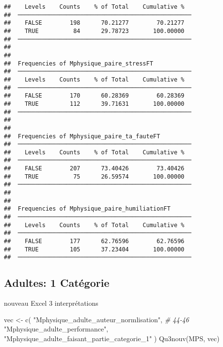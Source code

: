 \documentclass[
]{article}
\newenvironment{Shaded}{\begin{snugshade}}{\end{snugshade}}
\newcommand{\CommentTok}[1]{\textcolor[rgb]{0.56,0.35,0.01}{\textit{#1}}}
\newcommand{\FunctionTok}[1]{\textcolor[rgb]{0.00,0.00,0.00}{#1}}
\newcommand{\NormalTok}[1]{#1}
\newcommand{\OtherTok}[1]{\textcolor[rgb]{0.56,0.35,0.01}{#1}}
\newcommand{\StringTok}[1]{\textcolor[rgb]{0.31,0.60,0.02}{#1}}
\begin{document}
\begin{verbatim}
##    Levels    Counts    % of Total    Cumulative %   
##  ────────────────────────────────────────────────── 
##    FALSE        198      70.21277        70.21277   
##    TRUE          84      29.78723       100.00000   
##  ────────────────────────────────────────────────── 
## 
## 
##  Frequencies of Mphysique_paire_stressFT            
##  ────────────────────────────────────────────────── 
##    Levels    Counts    % of Total    Cumulative %   
##  ────────────────────────────────────────────────── 
##    FALSE        170      60.28369        60.28369   
##    TRUE         112      39.71631       100.00000   
##  ────────────────────────────────────────────────── 
## 
## 
##  Frequencies of Mphysique_paire_ta_fauteFT          
##  ────────────────────────────────────────────────── 
##    Levels    Counts    % of Total    Cumulative %   
##  ────────────────────────────────────────────────── 
##    FALSE        207      73.40426        73.40426   
##    TRUE          75      26.59574       100.00000   
##  ────────────────────────────────────────────────── 
## 
## 
##  Frequencies of Mphysique_paire_humiliationFT       
##  ────────────────────────────────────────────────── 
##    Levels    Counts    % of Total    Cumulative %   
##  ────────────────────────────────────────────────── 
##    FALSE        177      62.76596        62.76596   
##    TRUE         105      37.23404       100.00000   
##  ──────────────────────────────────────────────────
\end{verbatim}

\hypertarget{adultes-1-catuxe9gorie}{%
\subsection{Adultes: 1 Catégorie}\label{adultes-1-catuxe9gorie}}

nouveau Excel 3 interprétations

\begin{Shaded}
\begin{Highlighting}[]
\NormalTok{vec }\OtherTok{\textless{}{-}} \FunctionTok{c}\NormalTok{(}
  \StringTok{"Mphysique\_adulte\_auteur\_normlisation"}\NormalTok{,   }\CommentTok{\# 44{-}46}
  \StringTok{"Mphysique\_adulte\_performance"}\NormalTok{,}
  \StringTok{"Mphysique\_adulte\_faisant\_partie\_categorie\_1"}
\NormalTok{  )  }
\FunctionTok{Qu3nouv}\NormalTok{(MPS, vec)}
\end{Highlighting}
\end{Shaded}
\end{document}
